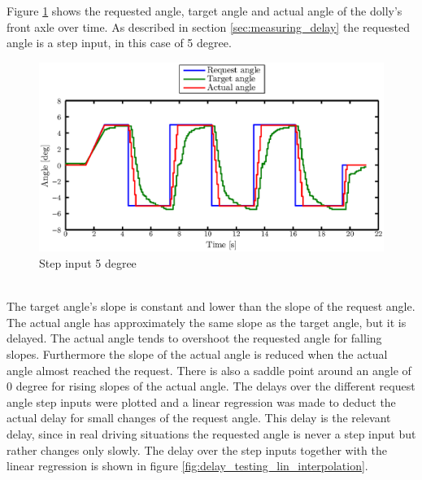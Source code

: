 \documentclass[ExampleMasters.tex]{subfiles}
\begin{document}
Figure \ref{fig:step_input} shows the requested angle, target angle and actual angle of the dolly's front axle over time. As described in section \ref{sec:measuring_delay} the requested angle is a step input, in this case of 5 degree.
\begin{figure}[!hbt]
	\centering
	\includegraphics[width=1\linewidth]{figures/lifted_front_5deg}
	\caption{Step input 5 degree}
	
	\label{fig:step_input}
\end{figure}\\
The target angle's slope is constant and lower than the slope of the request angle. The actual angle has approximately the same slope as the target angle, but it is delayed. The actual angle tends to overshoot the requested angle for falling slopes. Furthermore the slope of the actual angle is reduced when the actual angle almost reached the request. There is also a saddle point around an angle of 0 degree for rising slopes of the actual angle.          
The delays over the different request angle step inputs were plotted and a linear regression was made to deduct the actual delay for small changes of the request angle. This delay is the relevant delay, since in real driving situations the requested angle is never a step input but rather changes only slowly. The delay over the step inputs together with the linear regression is shown in figure \ref{fig:delay_testing_lin_interpolation}.    
\end{document}
